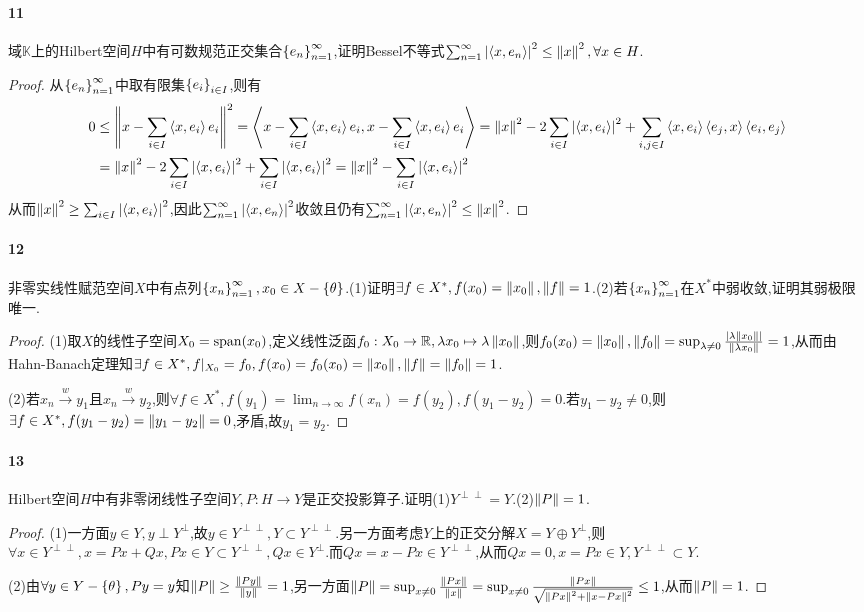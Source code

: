 \documentclass{article}
\begin{document}
\paragraph{11}域$\mathbb{K}$上的Hilbert空间$H$中有可数规范正交集合$\left\{e_n\right\}_{n=1}^\infty$,证明Bessel不等式$\sum_{n=1}^{\infty}\left|\left<x,e_n\right>\right|^2\leq\left\|x\right\|^2, \forall x\in H$.
\begin{proof}
    从$\left\{e_n\right\}_{n=1}^\infty$中取有限集$\left\{e_i\right\}_{i\in I}$,则有
    $$\begin{aligned}
        0&\leq \left\|x-\sum_{i\in I}\left<x,e_i\right>e_i\right\|^2=\left<x-\sum_{i\in I}\left<x,e_i\right>e_i,x-\sum_{i\in I}\left<x,e_i\right>e_i\right>=\left\|x\right\|^2-2\sum_{i\in I}\left|\left<x,e_i\right>\right|^2+\sum_{i,j\in I}\left<x,e_i\right>\left<e_j,x\right>\left<e_i,e_j\right>\\
        &=\left\|x\right\|^2-2\sum_{i\in I}\left|\left<x,e_i\right>\right|^2+\sum_{i\in I}\left|\left<x,e_i\right>\right|^2=\left\|x\right\|^2-\sum_{i\in I}\left|\left<x,e_i\right>\right|^2
    \end{aligned}$$
    从而$\left\|x\right\|^2\geq \sum_{i\in I}\left|\left<x,e_i\right>\right|^2$,因此$\sum_{n=1}^\infty \left|\left<x,e_n\right>\right|^2$收敛且仍有$\sum_{n=1}^{\infty}\left|\left<x,e_n\right>\right|^2\leq\left\|x\right\|^2$.
\end{proof}

\paragraph{12}非零实线性赋范空间$X$中有点列$\left\{x_n\right\}_{n=1}^\infty, x_0\in X-\left\{\theta\right\}$.(1)证明$\exists f\in X^*, f(x_0)=\left\|x_0\right\|, \left\|f\right\|=1$.(2)若$\left\{x_n\right\}_{n=1}^\infty$在$X^*$中弱收敛,证明其弱极限唯一.
\begin{proof}
    (1)取$X$的线性子空间$X_0=\mathrm{span}(x_0)$,定义线性泛函$f_0:X_0\to\mathbb{R}, \lambda x_0\mapsto \lambda\left\|x_0\right\|$,则$f_0(x_0)=\left\|x_0\right\|, \left\|f_0\right\|=\sup_{\lambda\neq 0}\frac{\left|\lambda\left\|x_0\right\|\right|}{\left\|\lambda x_0\right\|}=1$,从而由Hahn-Banach定理知$\exists f\in X^*, f|_{X_0}=f_0, f(x_0)=f_0(x_0)=\left\|x_0\right\|,\left\|f\right\|=\left\|f_0\right\|=1$.

    (2)若$x_n\overset{w}{\to}y_1$且$x_n\overset{w}{\to}y_2$,则$\forall f\in X^*,f(y_1)=\lim_{n\to \infty}f(x_n)=f(y_2), f(y_1-y_2)=0$.若$y_1-y_2\neq 0$,则$\exists f\in X^*, f(y_1-y_2)=\left\|y_1-y_2\right\|=0$,矛盾,故$y_1=y_2$.
\end{proof}

\paragraph{13}Hilbert空间$H$中有非零闭线性子空间$Y, P:H\to Y$是正交投影算子.证明(1)$Y^{\perp\perp}=Y$.(2)$\left\|P\right\|=1$.
\begin{proof}
    (1)一方面$y\in Y, y\perp Y^\perp$,故$y\in Y^{\perp\perp}, Y\subset Y^{\perp\perp}$.另一方面考虑$Y$上的正交分解$X=Y\oplus Y^\perp$,则$\forall x\in Y^{\perp\perp}, x=Px+Qx, Px\in Y\subset Y^{\perp\perp}, Qx\in Y^\perp$.而$Qx=x-Px\in Y^{\perp\perp}$,从而$Qx=0, x=Px\in Y, Y^{\perp\perp}\subset Y$.

    (2)由$\forall y\in Y-\left\{\theta\right\}, Py=y$知$\left\|P\right\|\geq \frac{\left\|Py\right\|}{\left\|y\right\|}=1$,另一方面$\left\|P\right\|=\sup_{x\neq 0}\frac{\left\|Px\right\|}{\left\|x\right\|}=\sup_{x\neq 0}\frac{\left\|Px\right\|}{\sqrt{\left\|Px\right\|^2+\left\|x-Px\right\|^2}}\leq 1$,从而$\left\|P\right\|=1$.
\end{proof}
\end{document}
